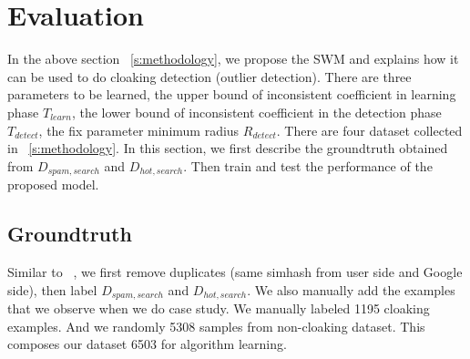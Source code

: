 \section{Evaluation}
\label{s:evaluation}



In the above section ~\autoref{s:methodology}, we propose the SWM and explains
how it can be used to do cloaking detection (outlier detection). There are three
parameters to be learned, the upper bound of inconsistent coefficient in
learning phase $T_{learn}$, the lower bound of inconsistent coefficient in the detection
phase $T_{detect}$, the fix parameter minimum radius $R_{detect}$. 
There are four dataset collected in ~\autoref{s:methodology}. In this section,
we first describe the groundtruth obtained from $D_{spam, search}$ and $D_{hot,
search}$. Then train and test the performance of the proposed model.

\subsection{Groundtruth}

Similar to ~\cite{lin2009detection}, we first remove duplicates (same simhash
from user side and Google side), then label $D_{spam, search}$ and $D_{hot,
search}$. We also manually add the examples that we observe when we do case
study. We manually labeled 1195 cloaking examples. And we randomly
 5308 samples from non-cloaking dataset. This composes our
dataset 6503 for algorithm learning.

%
%
%
%



